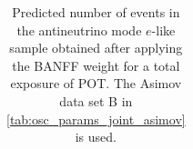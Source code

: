 \begin{table}
\begin{tabular} { | l ||r | r | r | r | r | r | | r | }
\end{tabular}
\caption{
Predicted number of events in the antineutrino mode $e$-like sample
obtained after applying the BANFF weight
for a total exposure of \TotalPotNuBarRunOneSevenB{} POT.
The Asimov data set B in \cref{tab:osc_params_joint_asimov} is used.
}
\label{tab:events_rhc1re_Asimov_B_Run17b}
\end{table}


